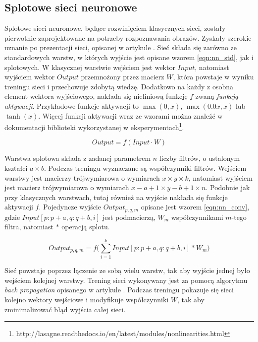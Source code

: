 \documentclass[shortabstract, mgr]{iithesis}
\begin{document}
	\subsection{Splotowe sieci neuronowe}
		
		Splotowe sieci neuronowe, będące rozwinięciem klasycznych sieci, zostały pierwotnie zaprojektowane na potrzeby rozpoznawania obrazów. Zyskały szerokie uznanie po prezentacji sieci, opisanej w artykule \cite{alex_net}. Sieć składa się zarówno ze standardowych warstw, w których wyjście jest opisane wzorem \ref{eqn:nn_std}, jak i splotowych.
		W klasycznej warstwie wejściem jest wektor $Input$, natomiast wyjściem wektor $Output$ przemnożony przez macierz $W$, która powstaje w wyniku treningu sieci i przechowuje zdobytą wiedzę. Dodatkowo na każdy z osobna element wektora wyjściowego, nakłada się nieliniową funkcję $f$ zwaną \textit{funkcją aktywacji}. Przykładowe funkcje aktywacji to $\max(0, x)$, $\max(0.0x, x)$ lub $\tanh(x)$. Więcej funkcji aktywacji wraz ze wzorami można znaleźć w dokumentacji biblioteki wykorzystanej w eksperymentach\footnote{http://lasagne.readthedocs.io/en/latest/modules/nonlinearities.html}. 
		
		\begin{equation}
			Output = f(Input \cdot W)
			\label{eqn:nn_std}
		\end{equation}
		
		Warstwa splotowa składa z zadanej parametrem $n$ liczby filtrów, o ustalonym kształci $a\times b$. Podczas treningu wyznaczane są współczynniki filtrów. Wejściem warstwy jest macierzy trójwymiarowa o wymiarach $x \times y \times k$, natomiast wyjściem jest macierz trójwymiarowa o wymiarach $x - a + 1 \times y - b + 1 \times n$. Podobnie jak przy klasycznych warstwach, tutaj również na wyjście nakłada się funkcje aktywacji $f$. Pojedyncze wyjście $Output_{p,q,m}$ opisane jest wzorem \ref{eqn:nn_conv}, gdzie $Input[p:p+a, q:q+b, i]$ jest podmacierzą, $W_m$ współczynnikami $m$-tego filtra, natomiast $\ast$ operacją splotu.
		
		\begin{equation}
		Output_{p,q,m} = f\bigg(\sum_{i=1}^k Input[p:p+a, q:q+b, i] \ast W_m\bigg)
		\label{eqn:nn_conv}
		\end{equation}
		
		Sieć powstaje poprzez łączenie ze sobą wielu warstw, tak aby wyjście jednej było wejściem kolejnej warstwy. Trening sieci wykonywany jest za pomocą algorytmu \textit{back propagation} opisanego w artykule \cite{pack_propagation}. Podczas treningu pokazuje się sieci kolejno wektory wejściowe i modyfikuje współczynniki $W$, tak aby zminimalizować błąd wyjścia całej sieci.
	
\end{document}
